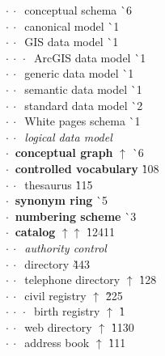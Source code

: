 \begin{tabbing}
$\cdot\:\cdot\:$  conceptual schema  \` {\raisebox{.4\height}{\scalebox{.6}{+}}}6\\
$\cdot\:\cdot\:$  canonical model  \` {\raisebox{.4\height}{\scalebox{.6}{+}}}1\\
$\cdot\:\cdot\:$  GIS data model  \` {\raisebox{.4\height}{\scalebox{.6}{+}}}1\\
$\cdot\:\cdot\:\cdot\:$  ArcGIS data model  \` {\raisebox{.4\height}{\scalebox{.6}{+}}}1\\
$\cdot\:\cdot\:$  generic data model  \` {\raisebox{.4\height}{\scalebox{.6}{+}}}1\\
$\cdot\:\cdot\:$  semantic data model  \` {\raisebox{.4\height}{\scalebox{.6}{+}}}1\\
$\cdot\:\cdot\:$  standard data model  \` {\raisebox{.4\height}{\scalebox{.6}{+}}}2\\
$\cdot\:\cdot\:$  White pages schema  \` {\raisebox{.4\height}{\scalebox{.6}{+}}}1\\
$\cdot\:\cdot\:$  \textit{logical data model}\\
$\cdot\:$  \textbf{conceptual graph} $\uparrow$ \` {\raisebox{.4\height}{\scalebox{.6}{+}}}6\\
$\cdot\:$  \textbf{controlled vocabulary}  \` 10{\raisebox{.4\height}{\scalebox{.6}{+}}}8\\
$\cdot\:\cdot\:$  thesaurus  \` 11{\raisebox{.4\height}{\scalebox{.6}{+}}}5\\
$\cdot\:$  \textbf{synonym ring}  \` {\raisebox{.4\height}{\scalebox{.6}{+}}}5\\
$\cdot\:$  \textbf{numbering scheme}  \` {\raisebox{.4\height}{\scalebox{.6}{+}}}3\\
$\cdot\:$  \textbf{catalog} $\uparrow\uparrow$ \` 124{\raisebox{.4\height}{\scalebox{.6}{+}}}11\\
$\cdot\:\cdot\:$  \textit{authority control}\\
$\cdot\:\cdot\:$  directory  \` 4{\raisebox{.4\height}{\scalebox{.6}{+}}}43\\
$\cdot\:\cdot\:$  telephone directory $\uparrow$ \` 1{\raisebox{.4\height}{\scalebox{.6}{+}}}28\\
$\cdot\:\cdot\:$  civil registry $\uparrow$ \` 2{\raisebox{.4\height}{\scalebox{.6}{+}}}25\\
$\cdot\:\cdot\:\cdot\:$  birth registry $\uparrow$ \` 1\\
$\cdot\:\cdot\:$  web directory $\uparrow$ \` 11{\raisebox{.4\height}{\scalebox{.6}{+}}}30\\
$\cdot\:\cdot\:$  address book $\uparrow$ \` 1{\raisebox{.4\height}{\scalebox{.6}{+}}}11\\

\end{tabbing}
